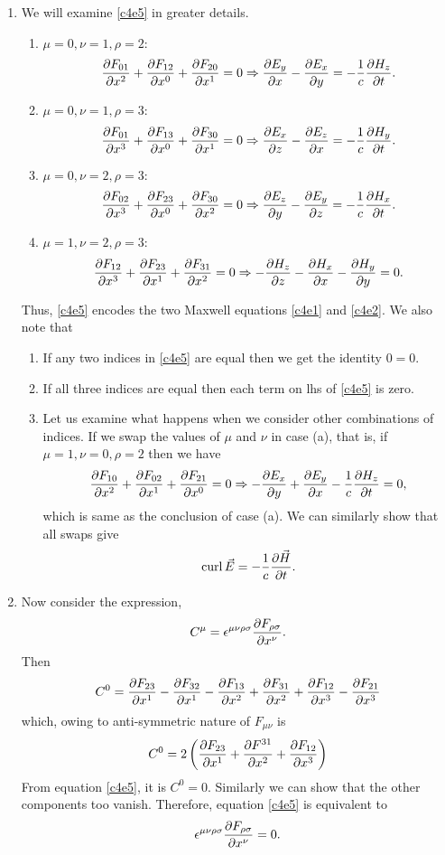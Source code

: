 \begin{enumerate}
\item We will examine \eqref{c4e5} in greater details.
\begin{enumerate}
\item $\mu = 0, \nu = 1, \rho = 2$:
\[
\frac{\partial{F_{01}}}{\partial{x^2}} + \frac{\partial{F_{12}}}{\partial{x^0}} + \frac{\partial{F_{20}}}{\partial{x^1}} = 0 \Rightarrow
\frac{\partial{E_y}}{\partial{x}} - \frac{\partial{E_x}}{\partial{y}} = - \frac{1}{c}\frac{\partial{H_z}}{\partial{t}}.
\]

\item $\mu = 0, \nu = 1, \rho = 3$:
\[
\frac{\partial{F_{01}}}{\partial{x^3}} + \frac{\partial{F_{13}}}{\partial{x^0}} + \frac{\partial{F_{30}}}{\partial{x^1}} = 0 \Rightarrow
\frac{\partial{E_x}}{\partial{z}} - \frac{\partial{E_z}}{\partial{x}} = - \frac{1}{c}\frac{\partial{H_y}}{\partial{t}}.
\]

\item $\mu = 0, \nu = 2, \rho = 3$:
\[
\frac{\partial{F_{02}}}{\partial{x^3}} + \frac{\partial{F_{23}}}{\partial{x^0}} + \frac{\partial{F_{30}}}{\partial{x^2}} = 0 \Rightarrow
\frac{\partial{E_z}}{\partial{y}} - \frac{\partial{E_y}}{\partial{z}} = - \frac{1}{c}\frac{\partial{H_x}}{\partial{t}}.
\]

\item $\mu = 1, \nu = 2, \rho = 3$:
\[
\frac{\partial{F_{12}}}{\partial{x^3}} + \frac{\partial{F_{23}}}{\partial{x^1}} + \frac{\partial{F_{31}}}{\partial{x^2}} = 0 \Rightarrow
-\frac{\partial{H_z}}{\partial{z}} - \frac{\partial{H_x}}{\partial{x}} - \frac{\partial{H_y}}{\partial{y}} = 0.
\]
\end{enumerate}
Thus, \eqref{c4e5} encodes the two Maxwell equations \eqref{c4e1} and \eqref{c4e2}.
We also note that
\begin{enumerate}
\item If any two indices in \eqref{c4e5} are equal then we get the identity $0=0$.
\item If all three indices are equal then each term on lhs of \eqref{c4e5} is
zero.
\item Let us examine what happens when we consider other combinations of indices.
If we swap the values of $\mu$ and $\nu$ in case (a), that is, if $\mu = 1, \nu = 0,
\rho = 2$ then we have
\[
\frac{\partial{F_{10}}}{\partial{x^2}} + \frac{\partial{F_{02}}}{\partial{x^1}} + \frac{\partial{F_{21}}}{\partial{x^0}} = 0 \Rightarrow
-\frac{\partial{E_x}}{\partial{y}} + \frac{\partial{E_y}}{\partial{x}} - \frac{1}{c}\frac{\partial{H_z}}{\partial{t}} = 0,
\]
which is same as the conclusion of case (a). We can similarly show that all swaps
give 
\[
\operatorname{curl}\vec{E} = -\frac{1}{c}\frac{\partial{\vec{H}}}{\partial{t}}.
\]
\end{enumerate}

\item Now consider the expression,
\begin{equation}\label{c4e6}
C^\mu = \epsilon^{\mu\nu\rho\sigma}\frac{\partial{F_{\rho\sigma}}}{\partial{x^\nu}}.
\end{equation}
Then
\[
C^0 = \frac{\partial{F_{23}}}{\partial{x^1}} - \frac{\partial{F_{32}}}{\partial{x^1}} - \frac{\partial{F_{13}}}{\partial{x^2}} + \frac{\partial{F_{31}}}{\partial{x^2}}
 + \frac{\partial{F_{12}}}{\partial{x^3}} - \frac{\partial{F_{21}}}{\partial{x^3}}
\]
which, owing to anti-symmetric nature of $F_{\mu\nu}$ is
\[
C^0 = 2\left(\frac{\partial{F_{23}}}{\partial{x^1}} + \frac{\partial{F^{31}}}{\partial{x^2}} + \frac{\partial{F_{12}}}{\partial{x^3}}\right)
\]
From equation \eqref{c4e5}, it is $C^0 = 0$. Similarly we can show that the other
components too vanish. Therefore, equation \eqref{c4e5} is equivalent to
\begin{equation}\label{c4e7}
\epsilon^{\mu\nu\rho\sigma}\frac{\partial{F_{\rho\sigma}}}{\partial{x^\nu}} = 0.
\end{equation}


\end{enumerate}
